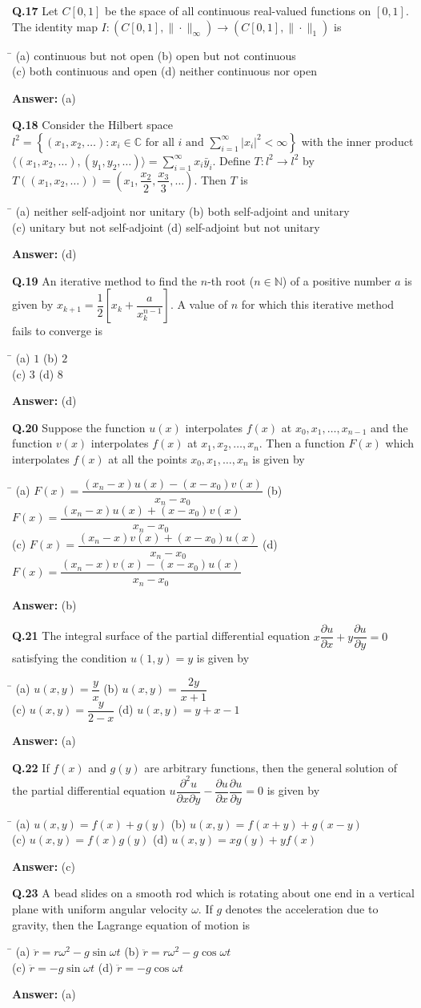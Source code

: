 \documentclass[11pt,a4paper]{article}
\newcommand{\optsfour}[4]{%
  \begin{tabbing}
    \hspace{0.48\linewidth}\=\kill
    (a) #1 \> (b) #2 \\[2pt]
    (c) #3 \> (d) #4
  \end{tabbing}%
}
\newcommand{\ans}[1]{\textbf{Answer:} #1\par\medskip}
\begin{document}
\textbf{Q.17} Let $C[0,1]$ be the space of all continuous real-valued functions on $[0,1]$. The identity map $I : (C[0,1], \|\cdot\|_\infty) \to (C[0,1], \|\cdot\|_1)$ is
\optsfour{continuous but not open}{open but not continuous}{both continuous and open}{neither continuous nor open}
\ans{(a)}

\textbf{Q.18} Consider the Hilbert space $l^2 = \left\{(x_1, x_2, \dots) : x_i \in \mathbb{C} \text{ for all } i \text{ and } \sum_{i=1}^{\infty} |x_i|^2 < \infty\right\}$ with the inner product $\langle (x_1, x_2, \dots), (y_1, y_2, \dots) \rangle = \sum_{i=1}^{\infty} x_i \bar{y}_i$. Define $T : l^2 \to l^2$ by $T((x_1, x_2, \dots)) = \left(x_1, \dfrac{x_2}{2}, \dfrac{x_3}{3}, \dots\right)$. Then $T$ is
\optsfour{neither self-adjoint nor unitary}{both self-adjoint and unitary}{unitary but not self-adjoint}{self-adjoint but not unitary}
\ans{(d)}

\textbf{Q.19} An iterative method to find the $n$-th root ($n \in \mathbb{N}$) of a positive number $a$ is given by $x_{k+1} = \dfrac{1}{2}\!\left[x_k + \dfrac{a}{x_k^{n-1}}\right]$. A value of $n$ for which this iterative method fails to converge is
\optsfour{$1$}{$2$}{$3$}{$8$}
\ans{(d)}

\textbf{Q.20} Suppose the function $u(x)$ interpolates $f(x)$ at $x_0, x_1, \dots, x_{n-1}$ and the function $v(x)$ interpolates $f(x)$ at $x_1, x_2, \dots, x_n$. Then a function $F(x)$ which interpolates $f(x)$ at all the points $x_0, x_1, \dots, x_n$ is given by
\optsfour{$F(x) = \dfrac{(x_n - x)u(x) - (x - x_0)v(x)}{x_n - x_0}$}{$F(x) = \dfrac{(x_n - x)u(x) + (x - x_0)v(x)}{x_n - x_0}$}{$F(x) = \dfrac{(x_n - x)v(x) + (x - x_0)u(x)}{x_n - x_0}$}{$F(x) = \dfrac{(x_n - x)v(x) - (x - x_0)u(x)}{x_n - x_0}$}
\ans{(b)}

\textbf{Q.21} The integral surface of the partial differential equation $x\dfrac{\partial u}{\partial x} + y\dfrac{\partial u}{\partial y} = 0$ satisfying the condition $u(1, y) = y$ is given by
\optsfour{$u(x,y) = \dfrac{y}{x}$}{$u(x,y) = \dfrac{2y}{x + 1}$}{$u(x,y) = \dfrac{y}{2 - x}$}{$u(x,y) = y + x - 1$}
\ans{(a)}

\textbf{Q.22} If $f(x)$ and $g(y)$ are arbitrary functions, then the general solution of the partial differential equation $u\dfrac{\partial^2 u}{\partial x \partial y} - \dfrac{\partial u}{\partial x}\dfrac{\partial u}{\partial y} = 0$ is given by
\optsfour{$u(x,y) = f(x) + g(y)$}{$u(x,y) = f(x+y) + g(x-y)$}{$u(x,y) = f(x)g(y)$}{$u(x,y) = xg(y) + yf(x)$}
\ans{(c)}

\textbf{Q.23} A bead slides on a smooth rod which is rotating about one end in a vertical plane with uniform angular velocity $\omega$. If $g$ denotes the acceleration due to gravity, then the Lagrange equation of motion is
\optsfour{$\ddot{r} = r\omega^2 - g\sin\omega t$}{$\ddot{r} = r\omega^2 - g\cos\omega t$}{$\ddot{r} = -g\sin\omega t$}{$\ddot{r} = -g\cos\omega t$}
\ans{(a)}
\end{document}
